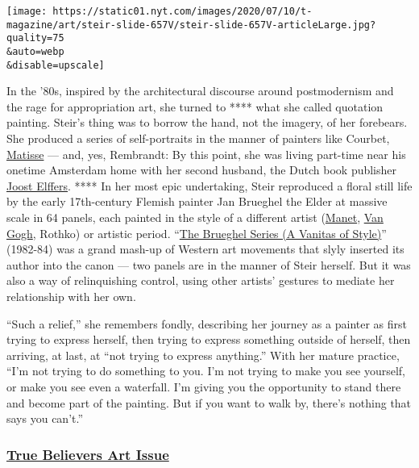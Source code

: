 \texttt{[image: https://static01.nyt.com/images/2020/07/10/t-magazine/art/steir-slide-657V/steir-slide-657V-articleLarge.jpg?quality=75\\\&auto=webp\\\&disable=upscale]}

In the '80s, inspired by the architectural discourse around
postmodernism and the rage for appropriation art, she turned to ****
what she called quotation painting. Steir's thing was to borrow the
hand, not the imagery, of her forebears. She produced a series of
self-portraits in the manner of painters like Courbet,
\href{https://www.nytimes.com/topic/person/henri-matisse}{Matisse} ---
and, yes, Rembrandt: By this point, she was living part-time near his
onetime Amsterdam home with her second husband, the Dutch book publisher
\href{https://www.nytimes.com/2019/10/28/style/the-secret-language-of-birthdays.html}{Joost
Elffers}. **** In her most epic undertaking, Steir reproduced a floral
still life by the early 17th-century Flemish painter Jan Brueghel the
Elder at massive scale in 64 panels, each painted in the style of a
different artist
(\href{https://www.nytimes.com/topic/person/edouard-manet}{Manet},
\href{https://www.nytimes.com/topic/person/vincent-van-gogh}{Van Gogh},
Rothko) or artistic period.
``\href{https://www.brooklynmuseum.org/opencollection/exhibitions/998}{The
Brueghel Series (A Vanitas of Style)}'' (1982-84) was a grand mash-up of
Western art movements that slyly inserted its author into the canon ---
two panels are in the manner of Steir herself. But it was also a way of
relinquishing control, using other artists' gestures to mediate her
relationship with her own.

``Such a relief,'' she remembers fondly, describing her journey as a
painter as first trying to express herself, then trying to express
something outside of herself, then arriving, at last, at ``not trying to
express anything.'' With her mature practice, ``I'm not trying to do
something to you. I'm not trying to make you see yourself, or make you
see even a waterfall. I'm giving you the opportunity to stand there and
become part of the painting. But if you want to walk by, there's nothing
that says you can't.''

\hypertarget{true-believers-art-issue}{%
\subsubsection{\texorpdfstring{\href{https://www.nytimes.com/issue/t-magazine/2020/07/02/true-believers-art-issue}{True
Believers Art
Issue}}{True Believers Art Issue}}\label{true-believers-art-issue}}

